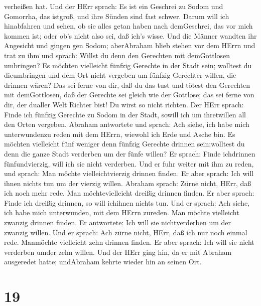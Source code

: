 verheißen hat.  Und der HErr sprach: Es ist ein Geschrei zu
Sodom und Gomorrha, das istgroß, und ihre Sünden sind fast schwer.
 Darum will ich hinabfahren und sehen, ob sie alles getan
haben nach demGeschrei, das vor mich kommen ist; oder ob's nicht also
sei, daß ich's wisse.  Und die Männer wandten ihr Angesicht
und gingen gen Sodom; aberAbraham blieb stehen vor dem HErrn
 und trat zu ihm und sprach: Willst du denn den Gerechten
mit demGottlosen umbringen?  Es möchten vielleicht fünfzig
Gerechte in der Stadt sein; wolltest du dieumbringen und dem Ort nicht
vergeben um fünfzig Gerechter willen, die drinnen wären? 
Das sei ferne von dir, daß du das tust und tötest den Gerechten mit
demGottlosen, daß der Gerechte sei gleich wie der Gottlose; das sei
ferne von dir, der dualler Welt Richter bist! Du wirst so nicht richten.
 Der HErr sprach: Finde ich fünfzig Gerechte zu Sodom in
der Stadt, sowill ich um ihretwillen all den Orten vergeben.
 Abraham antwortete und sprach: Ach siehe, ich habe mich
unterwundenzu reden mit dem HErrn, wiewohl ich Erde und Asche bin.
 Es möchten vielleicht fünf weniger denn fünfzig Gerechte
drinnen sein;wolltest du denn die ganze Stadt verderben um der fünfe
willen? Er sprach: Finde ichdrinnen fünfundvierzig, will ich sie nicht
verderben.  Und er fuhr weiter mit ihm zu reden, und
sprach: Man möchte vielleichtvierzig drinnen finden. Er aber sprach: Ich
will ihnen nichts tun um der vierzig willen.  Abraham
sprach: Zürne nicht, HErr, daß ich noch mehr rede. Man möchtevielleicht
dreißig drinnen finden. Er aber sprach: Finde ich dreißig drinnen, so
will ichihnen nichts tun.  Und er sprach: Ach siehe, ich
habe mich unterwunden, mit dem HErrn zureden. Man möchte vielleicht
zwanzig drinnen finden. Er antwortete: Ich will sie nichtverderben um
der zwanzig willen.  Und er sprach: Ach zürne nicht, HErr,
daß ich nur noch einmal rede. Manmöchte vielleicht zehn drinnen finden.
Er aber sprach: Ich will sie nicht verderben umder zehn willen.
 Und der HErr ging hin, da er mit Abraham ausgeredet hatte;
undAbraham kehrte wieder hin an seinen Ort.

\hypertarget{section-18}{%
\section{19}\label{section-18}}

